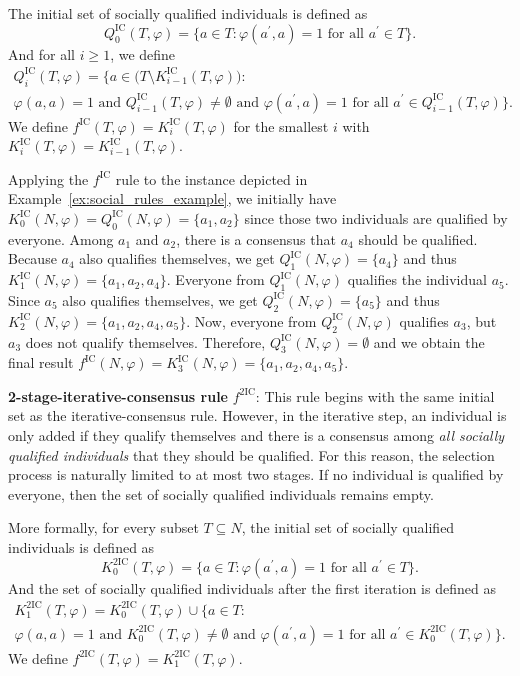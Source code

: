 \documentclass[
    12pt,               %
    a4paper,            %
    bibtotoc,           %
    pointlessnumbers,   %
    ngerman,            %
    titlepage,          %
    leqno,              %
    ]{scrarticle}       %
\newcommand\exref{Example~\ref}
\begin{document}
The initial set of socially qualified individuals is defined as
$$
Q^{\text{IC}}_0(T, \varphi) = \{ a \in T : \varphi(a^\prime, a) = 1 \text{ for all } a^\prime \in T \}.
$$
And for all $i \geq 1$, we define
\begin{multline*}
Q^{\text{IC}}_i(T, \varphi) = \{ a \in \big(T \setminus K^{\text{IC}}_{i-1}(T, \varphi)\big) : \\
\varphi(a, a) = 1 \text{ and }
Q^{\text{IC}}_{i-1}(T, \varphi) \neq \emptyset \text{ and }
\varphi(a^\prime, a) = 1 \text{ for all } a^\prime \in Q^{\text{IC}}_{i-1}(T, \varphi) \}.
\end{multline*}
We define $f^{\text{IC}}(T, \varphi) = K^{\text{IC}}_i(T, \varphi)$ for the smallest $i$ with $K^{\text{IC}}_i(T, \varphi) = K^{\text{IC}}_{i-1}(T, \varphi)$.

Applying the $f^{\text{IC}}$ rule to the instance depicted in \exref{ex:social_rules_example}, we initially have $K^{\text{IC}}_0(N, \varphi) = Q^{\text{IC}}_0(N, \varphi) = \{ a_1, a_2 \}$ since those two individuals are qualified by everyone. Among $a_1$ and $a_2$, there is a consensus that $a_4$ should be qualified. Because $a_4$ also qualifies themselves, we get $Q^{\text{IC}}_1(N, \varphi) = \{ a_4 \}$ and thus $K^{\text{IC}}_1(N, \varphi) = \{ a_1, a_2, a_4 \}$. Everyone from $Q^{\text{IC}}_1(N, \varphi)$ qualifies the individual $a_5$. Since $a_5$ also qualifies themselves, we get $Q^{\text{IC}}_2(N, \varphi) = \{ a_5 \}$ and thus $K^{\text{IC}}_2(N, \varphi) = \{ a_1, a_2, a_4, a_5 \}$. Now, everyone from $Q^{\text{IC}}_2(N, \varphi)$ qualifies $a_3$, but $a_3$ does not qualify themselves. Therefore, $Q^{\text{IC}}_3(N, \varphi) = \emptyset$ and we obtain the final result $f^{\text{IC}}(N, \varphi) = K^{\text{IC}}_3(N, \varphi) = \{ a_1, a_2, a_4, a_5 \}$.



\textbf{2-stage-iterative-consensus rule} $f^{\text{2IC}}$: This rule begins with the same initial set as the iterative-consensus rule. However, in the iterative step, an individual is only added if they qualify themselves and there is a consensus among \textit{all socially qualified individuals} that they should be qualified. For this reason, the selection process is naturally limited to at most two stages. If no individual is qualified by everyone, then the set of socially qualified individuals remains empty.

More formally, for every subset $T \subseteq N$, the initial set of socially qualified individuals is defined as
$$
K^{\text{2IC}}_0(T, \varphi) = \{ a \in T : \varphi(a^\prime, a) = 1 \text{ for all } a^\prime \in T \}.
$$
And the set of socially qualified individuals after the first iteration is defined as
\begin{multline*}
K^{\text{2IC}}_1(T, \varphi) = K^{\text{2IC}}_0(T, \varphi) \cup \{ a \in T : \\
\varphi(a, a) = 1 \text{ and }
K^{\text{2IC}}_0(T, \varphi) \neq \emptyset \text{ and }
\varphi(a^\prime, a) = 1 \text{ for all } a^\prime \in K^{\text{2IC}}_0(T, \varphi) \}.
\end{multline*}
We define $f^{\text{2IC}}(T, \varphi) = K^{\text{2IC}}_1(T, \varphi)$.
\end{document}
